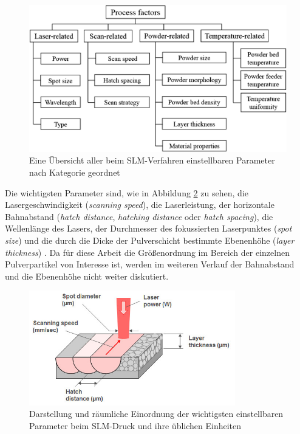 		\begin{figure}[ht]
			\centering
			\includegraphics[width=\textwidth]{chapter/main/img/scheme_parameters_2.png}
			\caption{Eine Übersicht aller beim SLM-Verfahren einstellbaren Parameter nach
			Kategorie geordnet \cite{zhang2017defect,aboulkhair2014reducing}}
			\label{fig:scheme_parameters}
		\end{figure}

		Die wichtigsten Parameter sind, wie in Abbildung \ref{fig:slm_parameters} zu sehen, die
		Lasergeschwindigkeit (\emph{scanning speed}), die Laserleistung, der horizontale
		Bahnabstand (\emph{hatch distance}, \emph{hatching distance} oder \emph{hatch spacing}),
		die Wellenlänge des Lasers, der Durchmesser des fokussierten Laserpunktes
		(\emph{spot size}) und die durch die Dicke der Pulverschicht bestimmte Ebenenhöhe
		(\emph{layer thickness}) \cite{sadali2020influence}. Da für diese Arbeit die Größenordnung
		im Bereich der einzelnen Pulverpartikel von Interesse ist, werden im weiteren Verlauf der
		Bahnabstand und die Ebenenhöhe nicht weiter diskutiert.

		\begin{figure}[ht]
			\centering
			\includegraphics[width=0.8\textwidth]{chapter/main/img/slm_parameters.jpg}
			\caption{Darstellung und räumliche Einordnung der wichtigsten einstellbaren Parameter
			beim SLM-Druck und ihre üblichen Einheiten \cite{saunders2017x}}
			\label{fig:slm_parameters}
		\end{figure}


